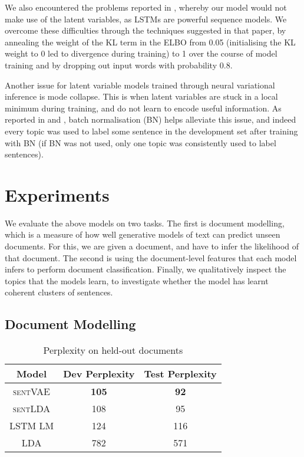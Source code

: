 We also encountered the problems reported in \citet{Bowman:16}, whereby our model would not make use of the latent variables, as LSTMs are powerful sequence models. We overcome these difficulties through the techniques suggested in that paper, by  annealing the weight of the KL term in the ELBO from 0.05 (initialising the KL weight to 0 led to divergence during training) to 1 over the course of model training and by dropping out input words with probability $0.8$.

Another issue for latent variable models trained through neural variational inference is mode collapse. This is when latent variables are stuck in a local minimum during training, and do not learn to encode useful information. As reported in \citet{Sonderby:16} and \citet{Strivastava:17}, batch normalisation (BN) \citep{Ioffe:15} helps alleviate this issue, and indeed every topic was used to label some sentence in the development set after training with BN (if BN was not used, only one topic was consistently used to label sentences).

\section{Experiments}

We evaluate the above models on two tasks. The first is document modelling, which is a measure of how well generative models of text can predict unseen documents. For this, we are given a document, and have to infer the likelihood of that document. The second is using the document-level features that each model infers to perform document classification. Finally, we qualitatively inspect the topics that the models learn, to investigate whether the model has learnt coherent clusters of sentences.

\subsection{Document Modelling}

\begin{table}[t]
    \centering
    \begin{tabular}{c|cc}
        \toprule
        Model & Dev Perplexity & Test Perplexity \\
        \midrule
        \textsc{sentVAE} & \textbf{105} & \textbf{92} \\
        \textsc{sentLDA} & 108 & 95 \\
        LSTM LM & 124 & 116 \\
        LDA & 782 & 571 \\
        \bottomrule
    \end{tabular}
    \caption{Perplexity on held-out documents}
    \label{tab:perplexity}
\end{table}

